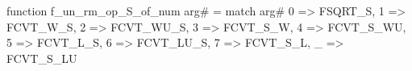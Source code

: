 function f_un_rm_op_S_of_num arg# = match arg# {
  0 => FSQRT_S,
  1 => FCVT_W_S,
  2 => FCVT_WU_S,
  3 => FCVT_S_W,
  4 => FCVT_S_WU,
  5 => FCVT_L_S,
  6 => FCVT_LU_S,
  7 => FCVT_S_L,
  _ => FCVT_S_LU
}

